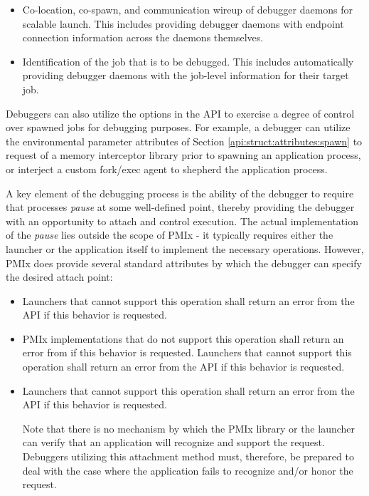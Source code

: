\begin{itemize}
    \item Co-location, co-spawn, and communication wireup of debugger daemons for scalable launch. This includes providing debugger daemons with endpoint connection information across the daemons themselves.
    \item Identification of the job that is to be debugged. This includes automatically providing debugger daemons with the job-level information for their target job.
\end{itemize}

Debuggers can also utilize the options in the  \ac{API} to exercise a degree of control over spawned jobs for debugging purposes. For example, a debugger can utilize the environmental parameter attributes of Section \ref{api:struct:attributes:spawn} to request  of a memory interceptor library prior to spawning an application process, or interject a custom fork/exec agent to shepherd the application process.

A key element of the debugging process is the ability of the debugger to require that processes \emph{pause} at some well-defined point, thereby providing the debugger with an opportunity to attach and control execution. The actual implementation of the \emph{pause} lies outside the scope of \ac{PMIx} - it typically requires either the launcher or the application itself to implement the necessary operations. However, \ac{PMIx} does provide several standard attributes by which the debugger can specify the desired attach point:

\begin{itemize}
    \item {}Launchers that cannot support this operation shall return an error from the  \ac{API} if this behavior is requested.
    \pasteAttributeItemEnd{}
    \item {}\ac{PMIx} implementations that do not support this operation shall return an error from  if this behavior is requested. Launchers that cannot support this operation shall return an error from the  \ac{API} if this behavior is requested.
    \pasteAttributeItemEnd{}
    \item {}Launchers that cannot support this operation shall return an error from the  \ac{API} if this behavior is requested.

    Note that there is no mechanism by which the \ac{PMIx} library or the launcher can verify that an application will recognize and support the  request. Debuggers utilizing this attachment method must, therefore, be prepared to deal with the case where the application fails to recognize and/or honor the request.
    \pasteAttributeItemEnd{}
\end{itemize}

